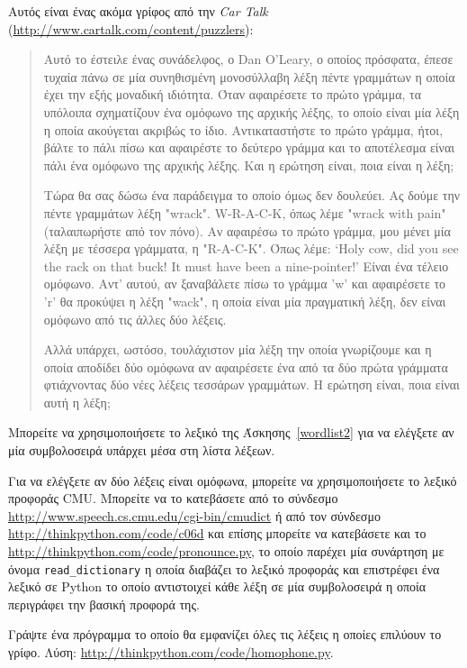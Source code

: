 \documentclass[10pt]{book}
\begin{document}
\begin{exercise}

Αυτός είναι ένας ακόμα γρίφος από την {\em Car
Talk} (\url{http://www.cartalk.com/content/puzzlers}):

\begin{quote}
 Αυτό το έστειλε ένας συνάδελφος, ο Dan O'Leary, ο οποίος πρόσφατα, έπεσε τυχαία πάνω σε μία συνηθισμένη μονοσύλλαβη λέξη πέντε γραμμάτων η οποία έχει την εξής μοναδική ιδιότητα. Όταν αφαιρέσετε το πρώτο γράμμα, τα υπόλοιπα σχηματίζουν ένα ομόφωνο της αρχικής λέξης, το οποίο είναι μία λέξη η οποία ακούγεται ακριβώς το ίδιο. Αντικαταστήστε το πρώτο γράμμα, ήτοι, βάλτε το πάλι πίσω και αφαιρέστε το δεύτερο γράμμα και το αποτέλεσμα είναι πάλι ένα ομόφωνο της αρχικής λέξης. Και η ερώτηση είναι, ποια είναι η λέξη; 

 Τώρα θα σας δώσω ένα παράδειγμα το οποίο όμως δεν δουλεύει. Ας δούμε την πέντε γραμμάτων λέξη "wrack". W-R-A-C-K, όπως λέμε "wrack with pain" (ταλαιπωρήστε από τον πόνο). Αν αφαιρέσω το πρώτο γράμμα, μου μένει μία λέξη με τέσσερα γράμματα, η "R-A-C-K". Όπως λέμε: `Holy cow, did you see the rack on that buck! It must have been a nine-pointer!' Είναι ένα τέλειο ομόφωνο. Αντ' αυτού, αν ξαναβάλετε πίσω το γράμμα 'w' και αφαιρέσετε το 'r' θα προκύψει η λέξη  "wack",  η οποία είναι μία πραγματική λέξη, δεν είναι ομόφωνο από τις άλλες δύο λέξεις. 

Αλλά υπάρχει, ωστόσο, τουλάχιστον μία λέξη την οποία γνωρίζουμε και η οποία αποδίδει δύο ομόφωνα αν αφαιρέσετε ένα από τα δύο πρώτα γράμματα φτιάχνοντας δύο νέες λέξεις τεσσάρων γραμμάτων. Η ερώτηση είναι, ποια είναι αυτή η λέξη;
\end{quote}

 Μπορείτε να χρησιμοποιήσετε το λεξικό της Άσκησης~\ref{wordlist2} για να ελέγξετε αν μία συμβολοσειρά υπάρχει μέσα στη λίστα λέξεων.

Για να ελέγξετε αν δύο λέξεις είναι ομόφωνα, μπορείτε να χρησιμοποιήσετε το λεξικό προφοράς CMU. Μπορείτε να το κατεβάσετε από το σύνδεσμο \url{http://www.speech.cs.cmu.edu/cgi-bin/cmudict} ή από τον σύνδεσμο \url{http://thinkpython.com/code/c06d} και επίσης μπορείτε να κατεβάσετε και το \url{http://thinkpython.com/code/pronounce.py}, το οποίο παρέχει μία συνάρτηση με όνομα \verb"read_dictionary" η οποία διαβάζει το λεξικό προφοράς και επιστρέφει ένα λεξικό σε Python το οποίο αντιστοιχεί κάθε λέξη σε μία συμβολοσειρά η οποία περιγράφει την βασική προφορά της.

Γράψτε ένα πρόγραμμα το οποίο θα εμφανίζει όλες τις λέξεις η οποίες επιλύουν το γρίφο. Λύση: \url{http://thinkpython.com/code/homophone.py}.

\end{exercise}
\end{document}

